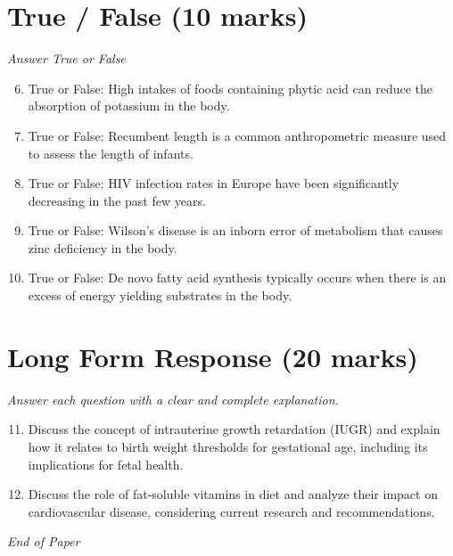 \documentclass[12pt]{article}
\begin{document}
\section*{True / False (10 marks)}
\textit{Answer True or False}
\begin{enumerate}[label=\arabic*.]
\setcounter{enumi}{5}
\item True or False: High intakes of foods containing phytic acid can reduce the absorption of potassium in the body.
\item True or False: Recumbent length is a common anthropometric measure used to assess the length of infants.
\item True or False: HIV infection rates in Europe have been significantly decreasing in the past few years.
\item True or False: Wilson's disease is an inborn error of metabolism that causes zinc deficiency in the body.
\item True or False: De novo fatty acid synthesis typically occurs when there is an excess of energy yielding substrates in the body.
\end{enumerate}

\section*{Long Form Response (20 marks)}
\textit{Answer each question with a clear and complete explanation.}
\begin{enumerate}[label=\arabic*.]
\setcounter{enumi}{10}
\item Discuss the concept of intrauterine growth retardation (IUGR) and explain how it relates to birth weight thresholds for gestational age, including its implications for fetal health.
\item Discuss the role of fat-soluble vitamins in diet and analyze their impact on cardiovascular disease, considering current research and recommendations.
\end{enumerate}

\vfill
\noindent\textit{End of Paper}
\end{document}
